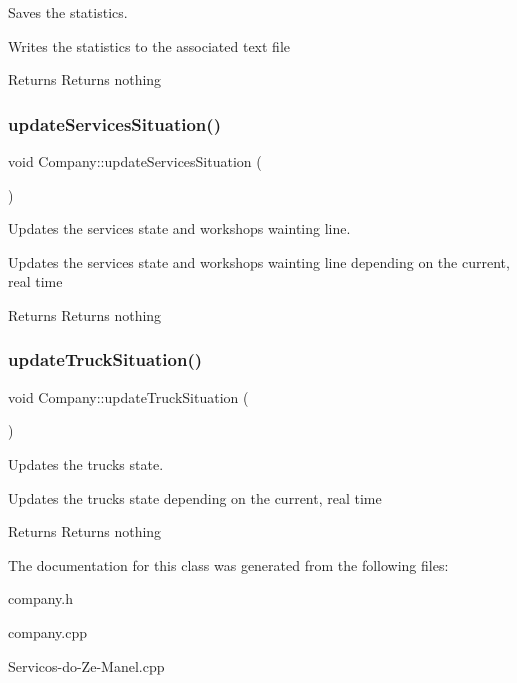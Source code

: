 Saves the statistics. 

Writes the statistics to the associated text file

\begin{DoxyReturn}{Returns}
Returns nothing 
\end{DoxyReturn}
\mbox{\label{class_company_ae5ce2e4c8d26951b71ca73c7589f6875}} 
\subsubsection{\texorpdfstring{update\+Services\+Situation()}{updateServicesSituation()}}
{\footnotesize\ttfamily void Company\+::update\+Services\+Situation (\begin{DoxyParamCaption}{ }\end{DoxyParamCaption})}



Updates the services\textquotesingle{} state and workshops\textquotesingle{} wainting line. 

Updates the services\textquotesingle{} state and workshops\textquotesingle{} wainting line depending on the current, real time

\begin{DoxyReturn}{Returns}
Returns nothing 
\end{DoxyReturn}
\mbox{\label{class_company_af058ee612ca75f1bbd6507e078e5de0a}} 
\subsubsection{\texorpdfstring{update\+Truck\+Situation()}{updateTruckSituation()}}
{\footnotesize\ttfamily void Company\+::update\+Truck\+Situation (\begin{DoxyParamCaption}{ }\end{DoxyParamCaption})}



Updates the truck\textquotesingle{}s state. 

Updates the truck\textquotesingle{}s state depending on the current, real time

\begin{DoxyReturn}{Returns}
Returns nothing 
\end{DoxyReturn}


The documentation for this class was generated from the following files\+:\begin{DoxyCompactItemize}
\item 
company.\+h\item 
company.\+cpp\item 
Servicos-\/do-\/\+Ze-\/\+Manel.\+cpp\end{DoxyCompactItemize}

